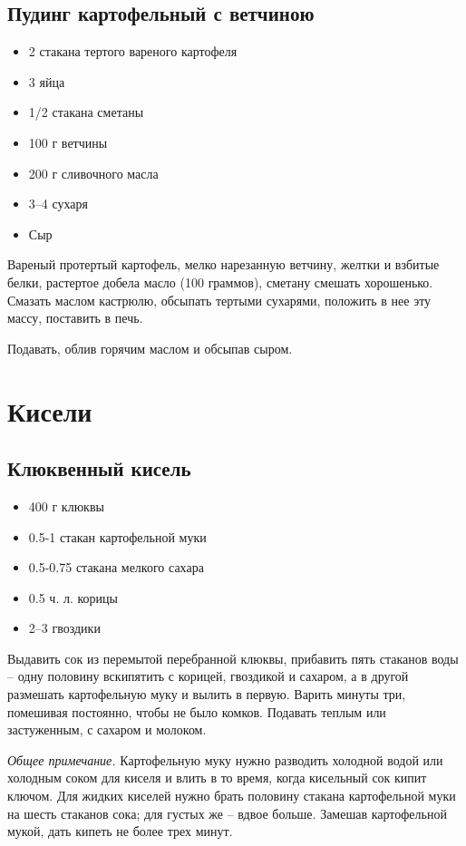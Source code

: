 \subsection{Пудинг картофельный с ветчиною}

\begin{itemize}
	\item 2 стакана тертого вареного картофеля 
    \item 3 яйца 
    \item 1/2 стакана сметаны 
    \item 100 г ветчины 
    \item 200 г сливочного масла 
    \item 3–4 сухаря 
    \item Сыр
\end{itemize}

Вареный протертый картофель, мелко нарезанную ветчину, желтки и взбитые белки, растертое добела масло (100 граммов), сметану смешать хорошенько. Смазать маслом кастрюлю, обсыпать тертыми сухарями, положить в нее эту массу, поставить в печь.

Подавать, облив горячим маслом и обсыпав сыром.

\newpage
\section{Кисели}

\subsection{Клюквенный кисель}

\begin{itemize}
	\item 400 г клюквы 
    \item 0.5-1 стакан картофельной муки 
    \item 0.5-0.75 стакана мелкого сахара 
    \item 0.5 ч. л. корицы 
    \item 2–3 гвоздики
\end{itemize}

Выдавить сок из перемытой перебранной клюквы, прибавить пять стаканов воды – одну половину вскипятить с корицей, гвоздикой и сахаром, а в другой размешать картофельную муку и вылить в первую. Варить минуты три, помешивая постоянно, чтобы не было комков. Подавать теплым или застуженным, с сахаром и молоком.

\emph{Общее примечание.} Картофельную муку нужно разводить холодной водой или холодным соком для киселя и влить в то время, когда кисельный сок кипит ключом. Для жидких киселей нужно брать половину стакана картофельной муки на шесть стаканов сока; для густых же – вдвое больше. Замешав картофельной мукой, дать кипеть не более трех минут.

